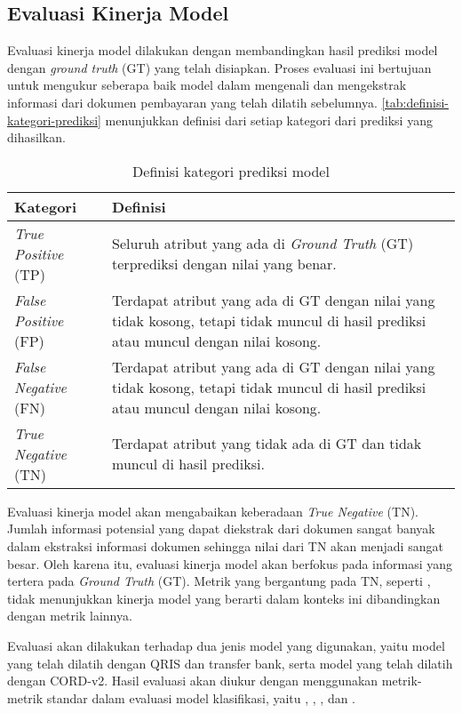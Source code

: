 \subsection{Evaluasi Kinerja Model}
\label{subsec:evaluasi-kinerja-model}

Evaluasi kinerja model dilakukan dengan membandingkan hasil prediksi model dengan \emph{ground truth} (GT) yang telah disiapkan. Proses evaluasi ini bertujuan untuk mengukur seberapa baik model dalam mengenali dan mengekstrak informasi dari dokumen pembayaran yang telah dilatih sebelumnya. \autoref{tab:definisi-kategori-prediksi} menunjukkan definisi dari setiap kategori dari prediksi yang dihasilkan.

\begin{table}[h!]
    \centering
    \caption{Definisi kategori prediksi model}
    \label{tab:definisi-kategori-prediksi}
    \begin{tabularx}{\textwidth}{|p{2.5cm}|X|}
        \hline
        \textbf{Kategori} & \textbf{Definisi} \\ \hline
        \emph{True Positive} (TP) & Seluruh atribut yang ada di \emph{Ground Truth} (GT) terprediksi dengan nilai yang benar. \\ \hline
        \emph{False Positive} (FP) & Terdapat atribut yang ada di GT dengan nilai yang tidak kosong, tetapi tidak muncul di hasil prediksi atau muncul dengan nilai kosong. \\ \hline
        \emph{False Negative} (FN) & Terdapat atribut yang ada di GT dengan nilai yang tidak kosong, tetapi tidak muncul di hasil prediksi atau muncul dengan nilai kosong. \\ \hline
        \emph{True Negative} (TN) & Terdapat atribut yang tidak ada di GT dan tidak muncul di hasil prediksi. \\ \hline
    \end{tabularx}
\end{table}

Evaluasi kinerja model akan mengabaikan keberadaan \emph{True Negative} (TN). Jumlah informasi potensial yang dapat diekstrak dari dokumen sangat banyak dalam ekstraksi informasi dokumen sehingga nilai dari TN akan menjadi sangat besar. Oleh karena itu, evaluasi kinerja model akan berfokus pada informasi yang tertera pada \emph{Ground Truth} (GT). Metrik yang bergantung pada TN, seperti \accuracy, tidak menunjukkan kinerja model yang berarti dalam konteks ini dibandingkan dengan metrik lainnya. 

Evaluasi akan dilakukan terhadap dua jenis model yang digunakan, yaitu model \donut{} yang telah dilatih dengan \dataset{} QRIS dan transfer bank, serta model \donut{} yang telah dilatih dengan \dataset{} CORD-v2. Hasil evaluasi akan diukur dengan menggunakan metrik-metrik standar dalam evaluasi model klasifikasi, yaitu \accuracy, \precision, \recall, dan \fscore. 

